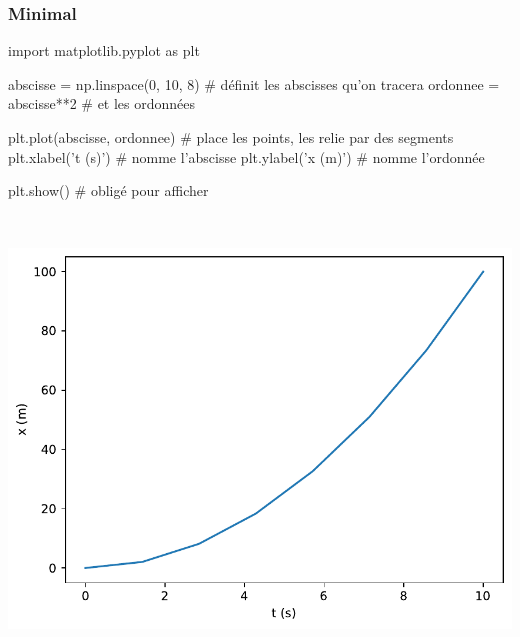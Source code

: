\documentclass[a4paper, 12pt, garamond]{book}
\begin{document}
\subsubsection{Minimal}
\begin{python}
import matplotlib.pyplot as plt

abscisse = np.linspace(0, 10, 8) # définit les abscisses qu'on tracera
ordonnee = abscisse**2           # et les ordonnées

plt.plot(abscisse, ordonnee)     # place les points, les relie par des segments
plt.xlabel('t (s)')              # nomme l'abscisse
plt.ylabel('x (m)')              # nomme l'ordonnée

plt.show()                       # obligé pour afficher
\end{python}

\begin{minipage}[t]{.48\linewidth}
	~
	\begin{center}
		\includegraphics[width=\linewidth]{figures/python_plt-1}
		\label{fig:mini}
	\end{center}
\end{minipage}
\hfill
\end{document}

